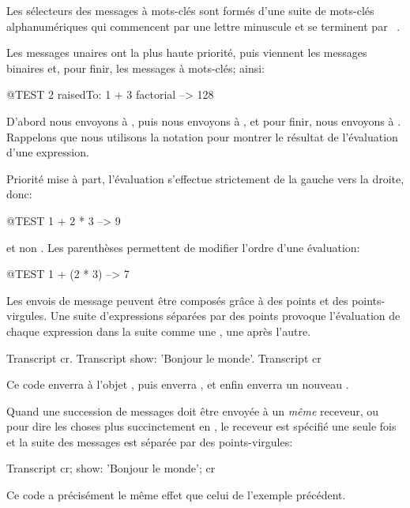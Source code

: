 \documentclass[a4paper,10pt,twoside]{book}
\begin{document}
Les sélecteurs des messages à mots-clés sont formés d'une suite de mots-clés alphanumériques 
qui commencent par une lettre minuscule et se terminent par \mbox{\lct{:}~.}

Les messages unaires ont la plus haute priorité, puis viennent les messages binaires et, 
pour finir, les messages à mots-clés; ainsi:
\begin{code}{@TEST}
2 raisedTo: 1 + 3 factorial --> 128
\end{code}
D'abord nous envoyons  à , puis nous envoyons  à , et pour finir, nous envoyons  à .  
Rappelons que nous utilisons la notation \ct{-->} pour montrer le résultat de l'évaluation d'une expression. 

Priorité mise à part, l'évaluation s'effectue strictement de la gauche vers la droite, donc: 
\begin{code}{@TEST}
1 + 2 * 3 --> 9
\end{code}
et non .
Les parenthèses permettent de modifier l'ordre d'une évaluation:
\begin{code}{@TEST}
1 + (2 * 3) --> 7
\end{code}
Les envois de message peuvent être composés grâce à des points et des points-virgules. Une suite d'expressions séparées par des points provoque  l'évaluation de chaque expression dans la suite comme une , une après l'autre. 

\begin{code}{}
Transcript cr.
Transcript show: 'Bonjour le monde'.
Transcript cr
\end{code}

\noindent
Ce code enverra  à l'objet , puis
enverra  , et enfin enverra un nouveau .

Quand une succession de messages doit être envoyée à un \emph{même} receveur, 
ou pour dire les choses plus succinctement en , le receveur est 
spécifié une seule fois et la suite des messages est séparée par des points-virgules:

\begin{code}{}
Transcript cr;
    show: 'Bonjour le monde';
    cr
\end{code}
Ce code a précisément le même effet que celui de l'exemple précédent.


\end{document}
